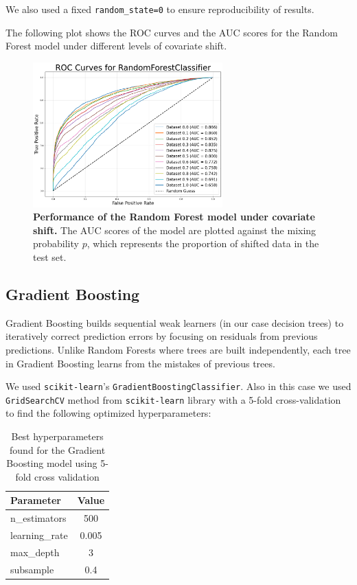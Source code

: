 We also used a fixed \texttt{random\_state=0} to ensure reproducibility of results.

The following plot shows the ROC curves and the AUC scores for the Random Forest model under different levels of covariate shift.

\vspace{0.5em}

\begin{figure}[H]
	\centering
	\includegraphics[width=0.65\textwidth]{assets/rf_auc.png}
	\caption{\textbf{Performance of the Random Forest model under covariate shift.} \newline The AUC scores of the model are plotted against the mixing probability $p$, which represents the proportion of shifted data in the test set.}
	\label{fig:random-forest-perf}
\end{figure}

\newpage

\subsection{Gradient Boosting}

Gradient Boosting builds sequential weak learners (in our case decision trees) to iteratively correct prediction errors by focusing on residuals from previous predictions. Unlike Random Forests where trees are built independently, each tree in Gradient Boosting learns from the mistakes of previous trees.

We used \texttt{scikit-learn}'s \texttt{GradientBoostingClassifier}. Also in this case we used \texttt{GridSearchCV} method from \texttt{scikit-learn} library with a 5-fold cross-validation to find the following optimized hyperparameters:

\vspace{0.3em}

\begin{table}[H]
	\centering
	\begin{tabular}{l|c}
		\toprule
		\textbf{Parameter} & \textbf{Value} \\
		\midrule
		n\_estimators & 500 \\
		learning\_rate & 0.005 \\
		max\_depth & 3 \\
		subsample & 0.4 \\
		\bottomrule
	\end{tabular}
	\caption{Best hyperparameters found for the Gradient Boosting model using 5-fold cross validation}
\end{table}

